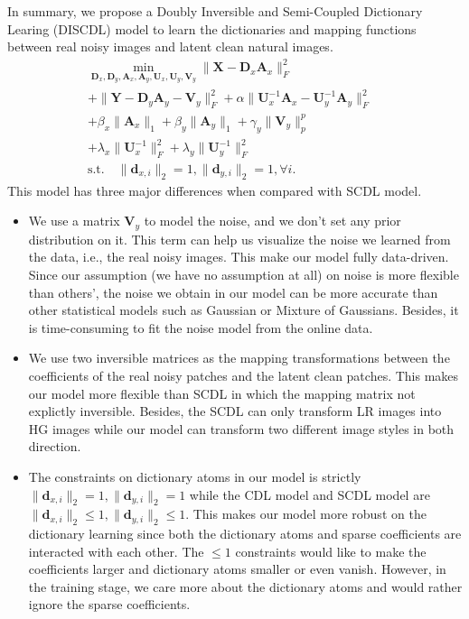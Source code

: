 \documentclass[10pt,twocolumn,letterpaper]{article}
\begin{document}
In summary, we propose a Doubly Inversible and Semi-Coupled Dictionary Learing (DISCDL) model to learn the dictionaries and mapping functions between real noisy images and latent clean natural images. 
\begin{equation}
\begin{split}
\min_{\mathbf{D}_{x},\mathbf{D}_{y},\mathbf{A}_{x},\mathbf{A}_{y},\mathbf{U}_{x},\mathbf{U}_{y},\mathbf{V}_{y}}
\|\mathbf{X}-\mathbf{D}_{x}\mathbf{A}_{x}\|_{F}^{2}&
\\
+
\|\mathbf{Y}-\mathbf{D}_{y}\mathbf{A}_{y}-\mathbf{V}_{y}\|_{F}^{2}
+
\alpha
\|\mathbf{U}_{x}^{-1}\mathbf{A}_{x}-\mathbf{U}_{y}^{-1}\mathbf{A}_{y}\|_{F}^{2}&
\\
+
\beta_{x}\|\mathbf{A}_{x}\|_{1}
+
\beta_{y}\|\mathbf{A}_{y}\|_{1}
+
\gamma_{y}\|\mathbf{V}_{y}\|_{p}^{p}&
\\
+
\lambda_{x}\|\mathbf{U}_{x}^{-1}\|_{F}^{2}
+
\lambda_{y}\|\mathbf{U}_{y}^{-1}\|_{F}^{2}
\\
\text{s.t.}\quad \|\mathbf{d}_{x,i}\|_{2}=1, \|\mathbf{d}_{y,i}\|_{2}=1, \forall{i}.
\end{split}
\end{equation}
This model has three major differences when compared with SCDL model.
\begin{itemize}
\item We use a matrix $\mathbf{V}_{y}$ to model the noise, and we don't set any prior distribution on it. This term can help us visualize the noise we learned from the data, i.e., the real noisy images. This make our model fully data-driven. Since our assumption (we have no assumption at all) on noise is more flexible than others', the noise we obtain in our model can be more accurate than other statistical models such as Gaussian or Mixture of Gaussians. Besides, it is time-consuming to fit the noise model from the online data. 
\item We use two inversible matrices as the mapping transformations between the coefficients of the real noisy patches and the latent clean patches. This makes our model more flexible than SCDL in which the mapping matrix not explictly inversible. Besides, the SCDL can only transform LR images into HG images while our model can transform two different image styles in both direction.
\item The constraints on dictionary atoms in our model is strictly $\|\mathbf{d}_{x,i}\|_{2}=1, \|\mathbf{d}_{y,i}\|_{2}=1$ while the CDL model and SCDL model are $\|\mathbf{d}_{x,i}\|_{2}\le1, \|\mathbf{d}_{y,i}\|_{2}\le1$. This makes our model more robust on the dictionary learning since both the dictionary atoms and sparse coefficients are interacted with each other. The $\le1$ constraints would like to make the coefficients larger and dictionary atoms smaller or even vanish. However, in the training stage, we care more about the dictionary atoms and would rather ignore the sparse coefficients.  
\end{itemize}
\end{document}
